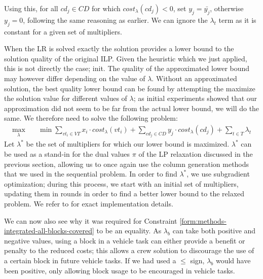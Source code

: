 \documentclass[]{article}
\begin{document}
Using this, for all $cd_j \in CD$ for which $cost_\lambda(cd_j) < 0$, set $y_j = \bar{y_{j}}$, otherwise $y_j = 0$, following the same reasoning as earlier. We can ignore the $\lambda_t$ term as it is constant for a given set of multipliers.

 When the LR is solved exactly the solution provides a lower bound to the solution quality of the original ILP. Given the heuristic which we just applied, this is not directly the case; init. The quality of the approximated lower bound may however differ depending on the value of $\lambda$. Without an approximated solution, the best quality lower bound can be found by attempting the maximize the solution value for different values of $\lambda$; as initial experiments showed that our approximation did not seem to be far from the actual lower bound, we will do the same. We therefore need to solve the following problem:
\begin{align}
\max_{\lambda} \quad & \min \sum_{vt_i \in VT} x_{i} \cdot cost_\lambda(vt_i) + \sum_{cd_j \in CD} y_{j} \cdot cost_\lambda(cd_j) + \sum_{t \in T} \lambda_{t}
\end{align}
Let $\lambda^*$ be the set of multipliers for which our lower bound is maximized. $\lambda^*$ can be used as a stand-in for the dual values $\pi$ of the LP relaxation discussed in the previous section, allowing us to once again use the column generation methods that we used in the sequential problem. In order to find $\lambda^*$, we use subgradient optimization; during this process, we start with an initial set of multipliers, updating them in rounds in order to find a better lower bound to the relaxed problem. We refer to \citet{Beasley1993} for exact implementation details. 

We can now also see why it was required for Constraint \ref{form:methods-integrated-all-blocks-covered} to be an equality. As $\lambda_b$ can take both positive and negative values, using a block in a vehicle task can either provide a benefit or penalty to the reduced costs; this allows a crew solution to discourage the use of a certain block in future vehicle tasks. If we had used a $\leq$ sign, $\lambda_b$ would have been positive, only allowing block usage to be encouraged in vehicle tasks. 
\end{document}
